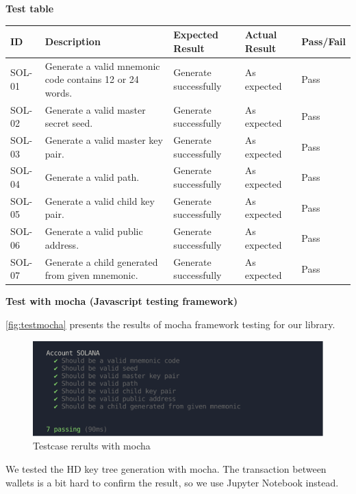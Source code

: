 \bigskip
{\textbf{Test table}}
\bigskip

\begin{tabular}{| m{2cm} | m{7cm} | m{2cm} | m{2cm} | m{2cm} |}
    \hline
    ID & Description & Expected Result & Actual Result & Pass/Fail                                            \\ \hline
    SOL-01 & Generate a valid mnemonic code contains 12 or 24 words. & Generate successfully & As expected & Pass \\ \hline
    SOL-02 & Generate a valid master secret seed.  &  Generate successfully & As expected & Pass  \\ \hline
    SOL-03 & Generate a valid master key pair. &   Generate successfully & As expected & Pass    \\ \hline
    SOL-04 & Generate a valid path. &  Generate successfully & As expected & Pass   \\ \hline
    SOL-05 & Generate a valid child key pair. &  Generate successfully & As expected & Pass   \\ \hline
    SOL-06 & Generate a valid public address.&  Generate successfully & As expected & Pass   \\ \hline
    SOL-07 & Generate a child generated from given mnemonic.&  Generate successfully & As expected & Pass   \\ \hline
\end{tabular}

\bigskip
{\textbf{Test with mocha (Javascript testing framework)}}

\bigskip
\autoref{fig:testmocha} presents the results of mocha framework testing for our library.
\bigskip

\begin{figure}[ht!]
    \centering
    \includegraphics[width=1\textwidth]{images/test_mocha.png}
    \caption[Testcase rerults with mocha]{Testcase rerults with mocha}
    \label{fig:testmocha}
\end{figure}

We tested the HD key tree generation with mocha. The transaction between wallets is a bit hard to confirm the result, so we use Jupyter Notebook instead.

